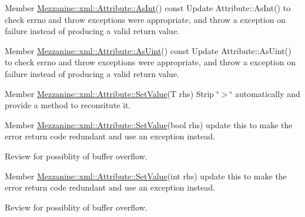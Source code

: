 \label{todo__todo000056}
\hypertarget{todo__todo000056}{}
 
\begin{DoxyDescription}
\item[Member \hyperlink{classMezzanine_1_1xml_1_1Attribute_afe13b2cfd2ae5425efdfbb7e537c5b02}{Mezzanine::xml::Attribute::AsInt}() const  ]Update Attribute::AsInt() to check errno and throw exceptions were appropriate, and throw a exception on failure instead of producing a valid return value. 
\end{DoxyDescription}

\label{todo__todo000057}
\hypertarget{todo__todo000057}{}
 
\begin{DoxyDescription}
\item[Member \hyperlink{classMezzanine_1_1xml_1_1Attribute_a5933a59c21bf71049ea71750f4c69bc3}{Mezzanine::xml::Attribute::AsUint}() const  ]Update Attribute::AsUint() to check errno and throw exceptions were appropriate, and throw a exception on failure instead of producing a valid return value. 
\end{DoxyDescription}

\label{todo__todo000053}
\hypertarget{todo__todo000053}{}
 
\begin{DoxyDescription}
\item[Member \hyperlink{classMezzanine_1_1xml_1_1Attribute_ab4ab2fb15cd198cd8527d796583cf994}{Mezzanine::xml::Attribute::SetValue}(T rhs) ]Strip \char`\"{}$>$\char`\"{} automatically and provide a method to reconsitute it. 
\end{DoxyDescription}

\label{todo__todo000052}
\hypertarget{todo__todo000052}{}
 
\begin{DoxyDescription}
\item[Member \hyperlink{classMezzanine_1_1xml_1_1Attribute_a4b4b035128dfe3c7fd70e228c70d5118}{Mezzanine::xml::Attribute::SetValue}(bool rhs) ]update this to make the error return code redundant and use an exception instead. 

Review for possiblity of buffer overflow. 
\end{DoxyDescription}

\label{todo__todo000049}
\hypertarget{todo__todo000049}{}
 
\begin{DoxyDescription}
\item[Member \hyperlink{classMezzanine_1_1xml_1_1Attribute_ae17cb2b4aadcf29fc74e6d16fa1ad746}{Mezzanine::xml::Attribute::SetValue}(int rhs) ]update this to make the error return code redundant and use an exception instead. 

Review for possiblity of buffer overflow. 
\end{DoxyDescription}


